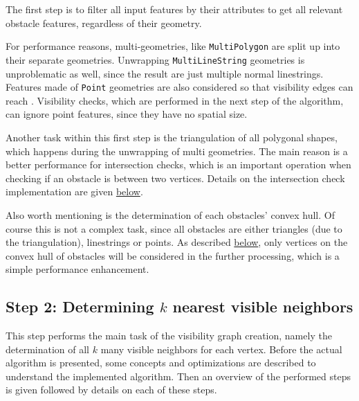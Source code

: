 		The first step is to filter all input features by their attributes to get all relevant obstacle features, regardless of their geometry.
		
		For performance reasons, multi-geometries, like \texttt{MultiPolygon} are split up into their separate geometries.
		Unwrapping \texttt{MultiLineString} geometries is unproblematic as well, since the result are just multiple normal linestrings.
		Features made of \texttt{Point} geometries are also considered so that visibility edges can reach .
		Visibility checks, which are performed in the next step of the algorithm, can ignore point features, since they have no spatial size.
		
		Another task within this first step is the triangulation of all polygonal shapes, which happens during the unwrapping of multi geometries.
		The main reason is a better performance for intersection checks, which is an important operation when checking if an obstacle is between two vertices.
		Details on the intersection check implementation are given \hyperref[subsubsec:intersection-checks]{below}.
		
		Also worth mentioning is the determination of each obstacles' convex hull.
		Of course this is not a complex task, since all obstacles are either triangles (due to the triangulation), linestrings or points.
		As described \hyperref[subsubsec:convex-hull]{below}, only vertices on the convex hull of obstacles will be considered in the further processing, which is a simple performance enhancement.
			
	\subsection{Step 2: Determining $k$ nearest visible neighbors}
	\label{subsec:step-2-knn-search}
			
		This step performs the main task of the visibility graph creation, namely the determination of all $k$ many visible neighbors for each vertex.
		Before the actual algorithm is presented, some concepts and optimizations are described to understand the implemented algorithm.
		Then an overview of the performed steps is given followed by details on each of these steps.
		
